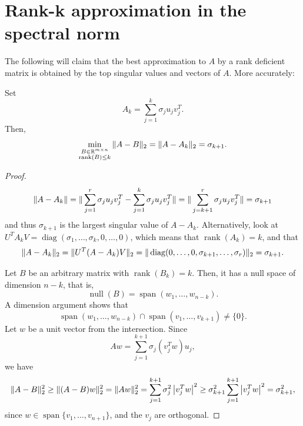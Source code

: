 \documentclass{article}
\begin{document}
\section{Rank-k approximation in the spectral norm}
The following will claim that the best approximation to $A$ by a rank deficient 
matrix is obtained by the top singular values and vectors of $A$. More accurately:
\begin{fact}
Set
\begin{equation*}
A_{k} = \sum_{j=1}^{k} \sigma_{j} u_{j} v_{j}^{T}.
\end{equation*}
Then,
\begin{equation*}
\min_{\substack{B \in \mathbb{R}^{m \times n} \\
\operatorname{rank}(B) \leq k}} \| A-B \|_{2} = \| A-A_{k} \|_{2}
= \sigma_{k+1}.
\end{equation*}
\end{fact}


\begin{proof}
\begin{equation*}
\| A-A_{k} \| = \| \sum_{j=1}^{r} \sigma_{j} u_{j} v_{j}^{T} - \sum_{j=1}^{k}
\sigma_{j} u_{j} v_{j}^{T} \| = \| \sum_{j=k+1}^{r} \sigma_{j} u_{j}
v_{j}^{T} \| = \sigma_{k+1} 
\end{equation*}
and thus $\sigma_{k+1}$ is the largest singular value of $A-A_{k}$.
Alternatively, look at $U^{T} A_{k} V =
\operatorname{diag}(\sigma_{1},\ldots,\sigma_{k},0,\ldots,0)$, which
means that $\operatorname{rank}(A_{k}) = k$, and that
\begin{equation*}
\| A-A_{k} \|_{2} = \| U^{T} (A-A_{k}) V \|_{2} =
\| \operatorname{diag}(0,\ldots,0,\sigma_{k+1},\ldots,\sigma_{r}) \|_{2}
= \sigma_{k+1}.
\end{equation*}

Let $B$ be an arbitrary matrix with $\operatorname{rank}(B_{k}) =
k$. Then, it has a null space of dimension $n-k$, that is,
\begin{equation*}
\operatorname{null}(B) = \operatorname{span}(w_{1},\ldots,w_{n-k}).
\end{equation*}
A dimension argument shows that
\begin{equation*}
\operatorname{span}(w_{1},\ldots,w_{n-k}) \cap
\operatorname{span}(v_{1},\ldots,v_{k+1}) \ne \{ 0 \}.
\end{equation*}
Let $w$ be a unit vector from the intersection. Since
\begin{equation*}
Aw = \sum_{j=1}^{k+1} \sigma_{j} (v_{j}^{T}w) u_{j},
\end{equation*}
we have
\begin{equation*}
\| A-B \|_{2}^{2} \ge \| (A-B)w \|_{2}^{2} = \| Aw \|_{2}^{2} =
\sum_{j=1}^{k+1} \sigma_{j}^{2} \left| v_{j}^{T}w \right|^{2} \ge
\sigma_{k+1}^{2} \sum_{j=1}^{k+1} \left| v_{j}^{T}w \right|^{2} =
\sigma_{k+1}^{2},
\end{equation*}
since $w \in \operatorname{span}\{v_{1},\ldots,v_{n+1}\}$, and the
$v_{j}$ are orthogonal.
\end{proof}
\end{document}
